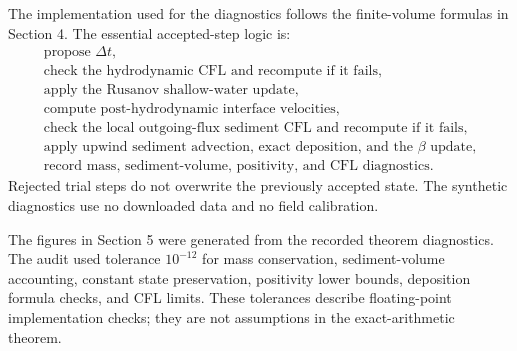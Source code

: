 The implementation used for the diagnostics follows the finite-volume formulas in Section 4. The essential accepted-step logic is:
\[
\begin{array}{l}
\text{propose } \Delta t,\\
\text{check the hydrodynamic CFL and recompute if it fails,}\\
\text{apply the Rusanov shallow-water update,}\\
\text{compute post-hydrodynamic interface velocities,}\\
\text{check the local outgoing-flux sediment CFL and recompute if it fails,}\\
\text{apply upwind sediment advection, exact deposition, and the }\beta\text{ update,}\\
\text{record mass, sediment-volume, positivity, and CFL diagnostics.}
\end{array}
\]
Rejected trial steps do not overwrite the previously accepted state. The synthetic diagnostics use no downloaded data and no field calibration.

The figures in Section 5 were generated from the recorded theorem diagnostics. The audit used tolerance \(10^{-12}\) for mass conservation, sediment-volume accounting, constant state preservation, positivity lower bounds, deposition formula checks, and CFL limits. These tolerances describe floating-point implementation checks; they are not assumptions in the exact-arithmetic theorem.
